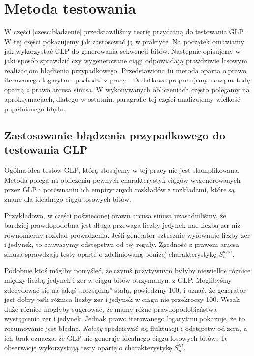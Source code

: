 \documentclass[a4paper,11pt,twoside]{book}
\newcommand{\Slil}[1]{S^{lil}_#1}
\newcommand{\Sasin}[1]{S^{asin}_#1}
\theoremstyle{definition}
\begin{document}
\chapter{Metoda testowania}
\label{czesc:metoda}
W części \ref{czesc:bladzenie} przedstawiliśmy teorię przydatną do testowania GLP. W tej części pokazujemy jak zastosować ją w praktyce.
Na początek omawiamy jak wykorzystać GLP do generowania sekwencji bitów. Następnie opisujemy w jaki sposób sprawdzić czy wygenerowane ciągi odpowiadają prawdziwie losowym realizacjom błądzenia przypadkowego. Przedstawiona tu metoda oparta o prawo iterowanego logarytmu pochodzi z pracy \cite{wang-nic}. Dodatkowo proponujemy nową metodę opartą o prawo arcusa sinusa. W wykonywanych obliczeniach często polegamy na aproksymacjach, dlatego w ostatnim paragrafie tej części analizujemy wielkość popełnianego błędu.



\section{Zastosowanie błądzenia przypadkowego do testowania GLP}

Ogólna idea testów GLP, którą stosujemy w tej pracy nie jest skomplikowana. Metoda polega na obliczeniu pewnych charakterystyk ciągów wygenerowanych przez GLP i porównaniu ich empirycznych rozkładów z rozkładami, które są znane dla idealnego ciągu losowych bitów.

Przykładowo, w części poświęconej prawu arcusa sinusa uzasadniliśmy, że bardziej prawdopodobna jest długa przewaga liczby jedynek nad liczbą zer niż równomierny rozkład prowadzenia. Jeśli generator sztucznie wyrównuje liczby zer i jedynek, to zauważymy odstępstwa od tej reguły. Zgodność z prawem arucsa sinusa sprawdzają testy oparte o zdefiniowaną poniżej charakterystykę $\Sasin{n}$.

Podobnie ktoś mógłby pomyśleć, że czymś pozytywnym byłyby niewielkie różnice między liczbą jedynek i zer w ciągu bitów otrzymanym z GLP. Moglibyśmy zdecydować się na jakąś ,,rozsądną'' stałą, powiedzmy 100, i uznać, że generator jest dobry jeśli różnica liczby zer i jedynek w ciągu nie przekroczy 100. Wszak duże różnice mogłyby sugerować, że mamy różne prawdopodobieństwa wystąpienia zer i jedynek. Jednak prawo iterowanego logarytmu pokazuje, że to rozumowanie jest błędne. \emph{Należy} spodziewać się fluktuacji i odstępstw od zera, a ich brak oznacza, że GLP nie generuje idealnego ciągu losowych bitów. Tę obserwację wykorzystują testy opartę o charakterystykę $\Slil{n}$.
\end{document}

